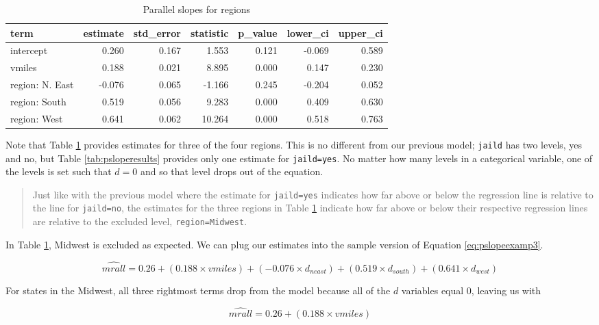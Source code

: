 \documentclass[
]{book}
\begin{document}
\begin{table}

\caption{\label{tab:psloperesults2}Parallel slopes for regions}
\centering
\begin{tabular}[t]{l|r|r|r|r|r|r}
\hline
term & estimate & std\_error & statistic & p\_value & lower\_ci & upper\_ci\\
\hline
intercept & 0.260 & 0.167 & 1.553 & 0.121 & -0.069 & 0.589\\
\hline
vmiles & 0.188 & 0.021 & 8.895 & 0.000 & 0.147 & 0.230\\
\hline
region: N. East & -0.076 & 0.065 & -1.166 & 0.245 & -0.204 & 0.052\\
\hline
region: South & 0.519 & 0.056 & 9.283 & 0.000 & 0.409 & 0.630\\
\hline
region: West & 0.641 & 0.062 & 10.264 & 0.000 & 0.518 & 0.763\\
\hline
\end{tabular}
\end{table}

Note that Table \ref{tab:psloperesults2} provides estimates for three of the four regions. This is no different from our previous model; \texttt{jaild} has two levels, yes and no, but Table \ref{tab:psloperesults} provides only one estimate for \texttt{jaild=yes}. No matter how many levels in a categorical variable, one of the levels is set such that \(d=0\) and so that level drops out of the equation.

\begin{quote}
Just like with the previous model where the estimate for \texttt{jaild=yes} indicates how far above or below the regression line is relative to the line for \texttt{jaild=no}, the estimates for the three regions in Table \ref{tab:psloperesults2} indicate how far above or below their respective regression lines are relative to the excluded level, \texttt{region=Midwest}.
\end{quote}

In Table \ref{tab:psloperesults2}, Midwest is excluded as expected. We can plug our estimates into the sample version of Equation \eqref{eq:pslopeexamp3}.

\[\hat{mrall} = 0.26 + (0.188 \times vmiles) + (-0.076 \times d_{neast}) + (0.519 \times d_{south}) + (0.641 \times d_{west})\]

For states in the Midwest, all three rightmost terms drop from the model because all of the \(d\) variables equal 0, leaving us with

\[\hat{mrall} = 0.26 + (0.188 \times vmiles)\]
\end{document}
